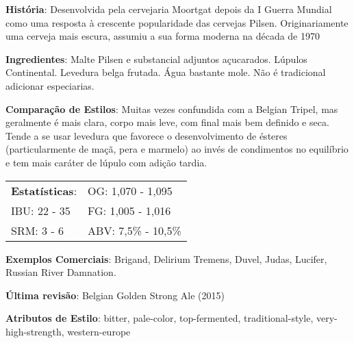 \textbf{História}: Desenvolvida pela cervejaria Moortgat depois da I Guerra Mundial como uma resposta à crescente popularidade das cervejas Pilsen. Originariamente uma cerveja mais escura, assumiu a sua forma moderna na década de 1970

\textbf{Ingredientes}: Malte Pilsen e substancial adjuntos açucarados. Lúpulos Continental. Levedura belga frutada. Água bastante mole. Não é tradicional adicionar especiarias.

\textbf{Comparação de Estilos}: Muitas vezes confundida com a Belgian Tripel, mas geralmente é mais clara, corpo mais leve, com final mais bem definido e seca. Tende a se usar levedura que favorece o desenvolvimento de ésteres (particularmente de maçã, pera e marmelo) ao invés de condimentos no equilíbrio e tem mais caráter de lúpulo com adição tardia.

\begin{tabular}{@{}p{35mm}p{35mm}@{}}
  \textbf{Estatísticas}: & OG: 1,070 - 1,095  \\
  IBU: 22 - 35  & FG: 1,005 - 1,016   \\
  SRM: 3 - 6 & ABV: 7,5\% - 10,5\%
\end{tabular}

\textbf{Exemplos Comerciais}: Brigand, Delirium Tremens, Duvel, Judas, Lucifer, Russian River Damnation.

\textbf{Última revisão}: Belgian Golden Strong Ale (2015)

\textbf{Atributos de Estilo}: bitter, pale-color, top-fermented, traditional-style, very-high-strength, western-europe

